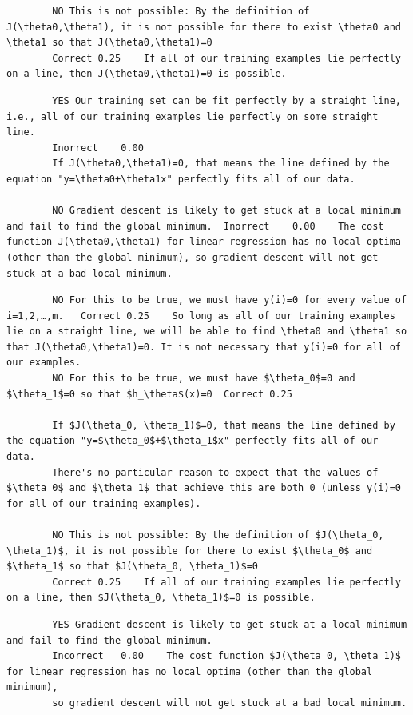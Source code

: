 \documentclass[11pt]{article} %
\begin{document}
		\begin{verbatim}
		NO This is not possible: By the definition of J(\theta0,\theta1), it is not possible for there to exist \theta0 and \theta1 so that J(\theta0,\theta1)=0	
		Correct	0.25	If all of our training examples lie perfectly on a line, then J(\theta0,\theta1)=0 is possible.
		\end{verbatim}
		
		\begin{verbatim}
		YES Our training set can be fit perfectly by a straight line, i.e., all of our training examples lie perfectly on some straight line.	
		Inorrect	0.00	
		If J(\theta0,\theta1)=0, that means the line defined by the equation "y=\theta0+\theta1x" perfectly fits all of our data.
		
		NO Gradient descent is likely to get stuck at a local minimum and fail to find the global minimum.	Inorrect	0.00	The cost function J(\theta0,\theta1) for linear regression has no local optima (other than the global minimum), so gradient descent will not get stuck at a bad local minimum.
		\end{verbatim}
		
		\begin{verbatim}
		NO For this to be true, we must have y(i)=0 for every value of i=1,2,…,m.	Correct	0.25	So long as all of our training examples lie on a straight line, we will be able to find \theta0 and \theta1 so that J(\theta0,\theta1)=0. It is not necessary that y(i)=0 for all of our examples.
		NO For this to be true, we must have $\theta_0$=0 and $\theta_1$=0 so that $h_\theta$(x)=0	Correct	0.25	
		
		If $J(\theta_0, \theta_1)$=0, that means the line defined by the equation "y=$\theta_0$+$\theta_1$x" perfectly fits all of our data. 
		There's no particular reason to expect that the values of $\theta_0$ and $\theta_1$ that achieve this are both 0 (unless y(i)=0 for all of our training examples).
		
		NO This is not possible: By the definition of $J(\theta_0, \theta_1)$, it is not possible for there to exist $\theta_0$ and $\theta_1$ so that $J(\theta_0, \theta_1)$=0	
		Correct	0.25	If all of our training examples lie perfectly on a line, then $J(\theta_0, \theta_1)$=0 is possible.
		\end{verbatim}
		
		\begin{verbatim}
		YES Gradient descent is likely to get stuck at a local minimum and fail to find the global minimum.	
		Incorrect	0.00	The cost function $J(\theta_0, \theta_1)$ for linear regression has no local optima (other than the global minimum), 
		so gradient descent will not get stuck at a bad local minimum.
		\end{verbatim}
		
\end{document}
